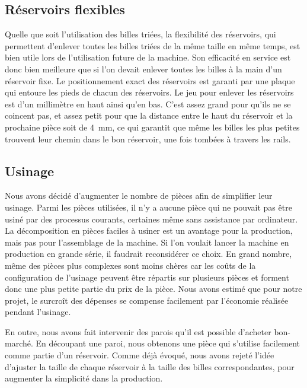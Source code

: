 \subsection{Réservoirs flexibles}
Quelle que soit l'utilisation des billes triées, la flexibilité des réservoirs, qui permettent d'enlever toutes les billes triées de la même taille en même temps, est bien utile lors de l'utilisation future de la machine. Son efficacité en service est donc bien meilleure que si l'on devait enlever toutes les billes à la main d'un réservoir fixe. Le positionnement exact des réservoirs est garanti par une plaque %
qui entoure les pieds de chacun des réservoirs. Le jeu pour enlever les réservoirs est d'un millimètre en haut ainsi qu'en bas. C'est assez grand pour qu'ils ne se coincent pas, et assez petit pour que la distance entre le haut du réservoir et la prochaine pièce soit de \SI{4}{\mm}, ce qui garantit que même les billes les plus petites trouvent leur chemin dans le bon réservoir, une fois tombées à travers les rails.

\subsection{Usinage}
Nous avons décidé d'augmenter le nombre de pièces afin de simplifier leur usinage. Parmi les pièces utilisées, il n'y a aucune pièce qui ne pouvait pas être usiné par des processus courants, certaines même sans assistance par ordinateur. La décomposition en pièces faciles à usiner est un avantage pour la production, mais pas pour l'assemblage de la machine. Si l'on voulait lancer la machine en production en grande série, il faudrait reconsidérer ce choix. En grand nombre, même des pièces plus complexes sont moins chères car les coûts de la configuration de l'usinage peuvent être répartis sur plusieurs pièces et forment donc une plus petite partie du prix de la pièce. Nous avons estimé que pour notre projet, le surcroît des dépenses se compense facilement par l'économie réalisée pendant l'usinage.

En outre, nous avons fait intervenir des parois qu'il est possible d'acheter bon-marché. En découpant une paroi, nous obtenons une pièce qui s'utilise facilement comme partie d'un réservoir. Comme déjà évoqué, nous avons rejeté l'idée d'ajuster la taille de chaque réservoir à la taille des billes correspondantes, pour augmenter la simplicité dans la production. 

